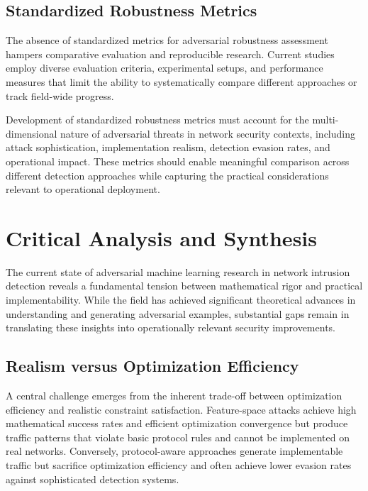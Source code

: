 \subsection{Standardized Robustness Metrics}

The absence of standardized metrics for adversarial robustness assessment hampers comparative evaluation and reproducible research. Current studies employ diverse evaluation criteria, experimental setups, and performance measures that limit the ability to systematically compare different approaches or track field-wide progress.

Development of standardized robustness metrics must account for the multi-dimensional nature of adversarial threats in network security contexts, including attack sophistication, implementation realism, detection evasion rates, and operational impact. These metrics should enable meaningful comparison across different detection approaches while capturing the practical considerations relevant to operational deployment.

\section{Critical Analysis and Synthesis}
\label{sec:critical_analysis}

The current state of adversarial machine learning research in network intrusion detection reveals a fundamental tension between mathematical rigor and practical implementability. While the field has achieved significant theoretical advances in understanding and generating adversarial examples, substantial gaps remain in translating these insights into operationally relevant security improvements.

\subsection{Realism versus Optimization Efficiency}

A central challenge emerges from the inherent trade-off between optimization efficiency and realistic constraint satisfaction. Feature-space attacks achieve high mathematical success rates and efficient optimization convergence but produce traffic patterns that violate basic protocol rules and cannot be implemented on real networks. Conversely, protocol-aware approaches generate implementable traffic but sacrifice optimization efficiency and often achieve lower evasion rates against sophisticated detection systems.


